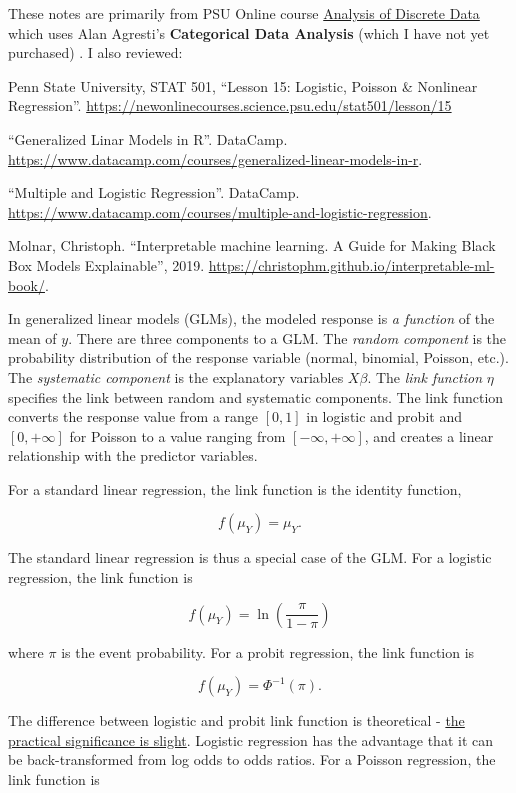 \documentclass[
]{book}
\begin{document}
These notes are primarily from PSU Online course \href{https://online.stat.psu.edu/stat504}{Analysis of Discrete Data} which uses Alan Agresti's \textbf{Categorical Data Analysis} (which I have not yet purchased) \citep{Agresti2013}. I also reviewed:

Penn State University, STAT 501, ``Lesson 15: Logistic, Poisson \& Nonlinear Regression''. \url{https://newonlinecourses.science.psu.edu/stat501/lesson/15}

``Generalized Linar Models in R''. DataCamp. \url{https://www.datacamp.com/courses/generalized-linear-models-in-r}.

``Multiple and Logistic Regression''. DataCamp. \url{https://www.datacamp.com/courses/multiple-and-logistic-regression}.

Molnar, Christoph. ``Interpretable machine learning. A Guide for Making Black Box Models Explainable'', 2019. \url{https://christophm.github.io/interpretable-ml-book/}.

In generalized linear models (GLMs), the modeled response is \emph{a function} of the mean of \(y\). There are three components to a GLM. The \emph{random component} is the probability distribution of the response variable (normal, binomial, Poisson, etc.). The \emph{systematic component} is the explanatory variables \(X\beta\). The \emph{link function} \(\eta\) specifies the link between random and systematic components. The link function converts the response value from a range \([0,1]\) in logistic and probit and \([0,+\infty]\) for Poisson to a value ranging from \([-\infty, +\infty]\), and creates a linear relationship with the predictor variables.

For a standard linear regression, the link function is the identity function,

\[f(\mu_Y) = \mu_Y.\]

The standard linear regression is thus a special case of the GLM. For a logistic regression, the link function is

\[f(\mu_Y) = \ln(\frac{\pi}{1-\pi})\]

where \(\pi\) is the event probability. For a probit regression, the link function is

\[f(\mu_Y) = \Phi^{-1}(\pi).\]

The difference between logistic and probit link function is theoretical - \href{https://www.theanalysisfactor.com/the-difference-between-logistic-and-probit-regression/}{the practical significance is slight}. Logistic regression has the advantage that it can be back-transformed from log odds to odds ratios. For a Poisson regression, the link function is
\end{document}
